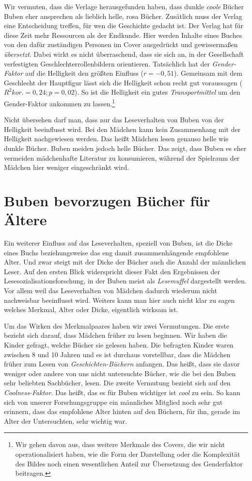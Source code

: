 Wir vermuten, dass die Verlage herausgefunden haben, dass dunkle
\emph{coole} Bücher Buben eher ansprechen als lieblich helle, rosa
Bücher. Zusätlich muss der Verlag eine Entscheidung treffen, für wen die
Geschichte gedacht ist. Der Verlag hat für diese Zeit mehr Ressourcen
als der Endkunde. Hier werden Inhalte eines Buches von den dafür
zuständigen Personen im Cover ausgedrückt und gewissermaßen
\emph{übersetzt}. Dabei wirkt es nicht überraschend, dass sie sich an,
in der Gesellschaft verfestigten Geschlechterrollenbildern orientieren.
Tatsächlich hat der \emph{Gender-Faktor} auf die Helligkeit den größten
Einfluss ($r=-0{,}51$). Gemeinsam mit dem Geschlecht der Hauptfigur
lässt sich die Helligkeit schon recht gut voraussagen
($R^2 \scriptstyle kor.\textstyle =0{,}24; p=0{,}02$). So ist die
Helligkeit ein gutes \emph{Transportmittel} um den Gender-Faktor
ankommen zu
lassen.\footnote{Wir gehen davon aus, dass weitere Merkmale des Covers, die wir nicht operationalisiert haben, wie die Form der Darstellung oder die Komplexität des Bildes noch einen wesentlichen Anteil zur Übersetzung des Genderfaktor beitragen.}

Nicht übersehen darf man, dass nur das Leseverhalten von Buben von der
Helligkeit beeinflusst wird. Bei den Mädchen kann kein Zusammenhang mit
der Helligkeit nachgewiesen werden. Das heißt Mädchen lesen genauso
helle wie dunkle Bücher. Buben meiden jedoch helle Bücher. Das zeigt,
dass Buben es eher vermeiden mädchenhafte Literatur zu konsumieren,
während der Spielraum der Mädchen hier weniger eingeschränkt wird.

\section{Buben bevorzugen Bücher für Ältere}

Ein weiterer Einfluss auf das Leseverhalten, speziell von Buben, ist die
Dicke eines Buchs beziehungsweise das eng damit zusammenhängende
empfohlene Alter. Und zwar steigt mit der Dicke der Bücher auch die
Anzahl der männlichen Leser. Auf den ersten Blick widerspricht dieser
Fakt den Ergebnissen der Lesesozialisationsforschung, in der Buben meist
als \emph{Lesemuffel} dargestellt werden. Vor allem weil das
Leseverhalten von Mädchen dadurch wiederum nicht nachweisbar beeinflusst
wird. Weiters kann man hier auch nicht klar zu sagen welches Merkmal,
Alter oder Dicke, eigentlich wirksam ist.

Um das Wirken des Merkmalpaares haben wir zwei Vermutungen. Die erste
bezieht sich darauf, dass Mädchen früher zu lesen beginnen. Wir haben
die Kinder gefragt, welche Bücher sie gelesen haben. Die befragten
Kinder waren zwischen 8 und 10 Jahren und es ist durchaus vorstellbar,
dass die Mädchen früher zum Lesen von \emph{Geschichten-Büchern}
anfangen. Das heißt, dass sie davor weniger oder andere von uns nicht
untersuchte Bücher, wie die bei den Buben sehr beliebten Sachbücher,
lesen. Die zweite Vermutung bezieht sich auf den \emph{Coolness-Faktor}.
Das heißt, das es für Buben wichtiger ist \emph{cool} zu sein. So kann
sich von unserer Forschungsgruppe ein männliches Mitglied noch sehr gut
erinnern, dass das empfohlene Alter hinten auf den Büchern, für ihn,
gerade im Alter der Untersuchten, sehr wichtig war.

